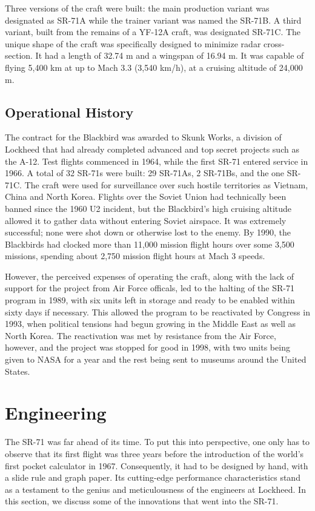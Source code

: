 \documentclass[12pt, draftnocls, onecolumn]{IEEEtran}
\begin{document}
	Three versions of the craft were built: the main production variant was designated as SR-71A while the trainer variant was named the SR-71B. A third variant, built from the remains of a YF-12A craft, was designated SR-71C.
	The unique shape of the craft was specifically designed to minimize radar cross-section. It had a length of 32.74 m and a wingspan of 16.94 m. It was capable of flying 5,400 km at up to Mach 3.3 (3,540 km/h), at a cruising altitude of 24,000 m.


	\subsection{Operational History}
	The contract for the Blackbird was awarded to Skunk Works, a division of Lockheed that had already completed advanced and top secret projects such as the A-12. Test flights commenced in 1964, while the first SR-71 entered service in 1966. A total of 32 SR-71s were built: 29 SR-71As, 2 SR-71Bs, and the one SR-71C. The craft were used for surveillance over such hostile territories as Vietnam, China and North Korea. Flights over the Soviet Union had technically been banned since the 1960 U2 incident, but the Blackbird's high cruising altitude allowed it to gather data without entering Soviet airspace. It was extremely successful; none were shot down or otherwise lost to the enemy. By 1990, the Blackbirds had clocked more than 11,000 mission flight hours over some 3,500 missions, spending about 2,750 mission flight hours at Mach 3 speeds\cite{stats}.

	However, the perceived expenses of operating the craft, along with the lack of support for the project from Air Force officals, led to the halting of the SR-71 program in 1989, with six units left in storage and ready to be enabled within sixty days if necessary. This allowed the program to be reactivated by Congress in 1993, when political tensions had begun growing in the Middle East as well as North Korea. The reactivation was met by resistance from the Air Force, however, and the project was stopped for good in 1998, with two units being given to NASA for a year and the rest being sent to museums around the United States.

	
\section{Engineering}

The SR-71 was far ahead of its time. To put this into perspective, one only has to observe that its first flight was three years before the introduction of the world's first pocket calculator in 1967. Consequently, it had to be designed by hand, with a slide rule and graph paper. Its cutting-edge performance characteristics stand as a testament to the genius and meticulousness of the engineers at Lockheed. In this section, we discuss some of the innovations that went into the SR-71.
\end{document}

